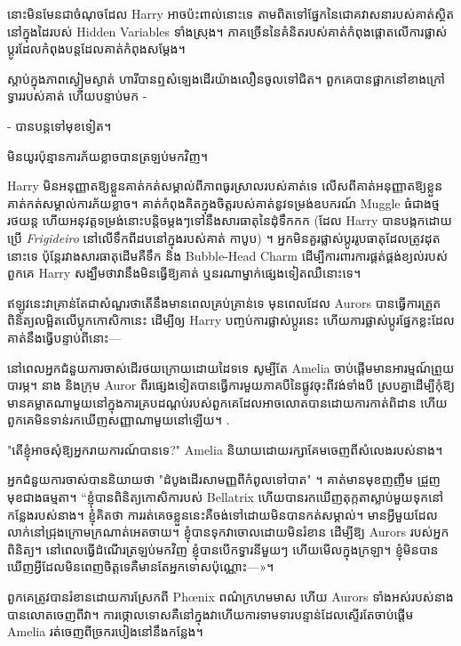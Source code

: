 {{{នោះមិនមែនជាចំណុចដែល Harry អាចប៉ះពាល់នោះទេ តាមពិតទៅផ្នែកនៃជោគវាសនារបស់គាត់ស្ថិតនៅក្នុងដៃរបស់ Hidden Variables ទាំងស្រុង។ ភាគច្រើននៃគំនិតរបស់គាត់កំពុងផ្តោតលើការផ្លាស់ប្តូរដែលកំពុងបន្តដែលគាត់កំពុងសម្តែង។

ស្តាប់ក្នុងភាពស្ងៀមស្ងាត់ ហារីបានឮសំឡេងដើរយ៉ាងលឿនចូលទៅជិត។ ពួកគេបានផ្អាកនៅខាងក្រៅទ្វាររបស់គាត់ ហើយបន្ទាប់មក -

- បានបន្តទៅមុខទៀត។

មិនយូរប៉ុន្មានការភ័យខ្លាចបានត្រឡប់មកវិញ។

Harry មិនអនុញ្ញាតឱ្យខ្លួនគាត់កត់សម្គាល់ពីភាពធូរស្រាលរបស់គាត់ទេ លើសពីគាត់អនុញ្ញាតឱ្យខ្លួនគាត់កត់សម្គាល់ការភ័យខ្លាច។ គាត់កំពុងគិតក្នុងចិត្តរបស់គាត់នូវទម្រង់ឧបករណ៍ Muggle ធំជាងថ្មរថយន្ត ហើយអនុវត្តទម្រង់នោះបន្តិចម្តងៗទៅនឹងសារធាតុនៃដុំទឹកកក (ដែល Harry បានបង្កកដោយប្រើ \emph{Frigideiro} នៅលើទឹកពីដបនៅក្នុងរបស់គាត់ កាបូប) ។ អ្នកមិនគួរផ្លាស់ប្តូររូបធាតុដែលត្រូវដុតនោះទេ ប៉ុន្តែរវាងសារធាតុដើមគឺទឹក និង Bubble-Head Charm ដើម្បីការពារការផ្គត់ផ្គង់ខ្យល់របស់ពួកគេ Harry សង្ឃឹមថាវានឹងមិនធ្វើឱ្យគាត់ ឬនរណាម្នាក់ផ្សេងទៀតឈឺនោះទេ។

ឥឡូវនេះវាគ្រាន់តែជាសំណួរថាតើនឹងមានពេលគ្រប់គ្រាន់ទេ មុនពេលដែល Aurors បានធ្វើការត្រួតពិនិត្យលម្អិតលើប្លុកកោសិកានេះ ដើម្បីឲ្យ Harry បញ្ចប់ការផ្លាស់ប្តូរនេះ ហើយការផ្លាស់ប្តូរផ្នែកខ្លះដែលគាត់នឹងធ្វើបន្ទាប់ពីនោះ—

\later

នៅពេលអ្នកជំនួយការចាស់ដើរថយក្រោយដោយដៃទទេ សូម្បីតែ Amelia ចាប់ផ្តើមមានអារម្មណ៍ព្រួយបារម្ភ។ នាង និងក្រុម Auror ពីរផ្សេងទៀតបានធ្វើការមួយភាគបីនៃផ្លូវចុះពីវង់ទាំងបី ស្របគ្នាដើម្បីកុំឱ្យមានគម្លាតណាមួយនៅក្នុងការគ្របដណ្តប់របស់ពួកគេដែលអាចលោតបានដោយការកាត់ពិដាន ហើយពួកគេមិនទាន់រកឃើញសញ្ញាណាមួយនៅឡើយ។ .

"តើខ្ញុំអាចសុំឱ្យអ្នករាយការណ៍បានទេ?" Amelia និយាយដោយរក្សាគែមចេញពីសំលេងរបស់នាង។

អ្នកជំនួយការចាស់បាននិយាយថា "ដំបូងដើរសាមញ្ញពីកំពូលទៅបាត" ។ គាត់​មាន​មុខ​ញញឺម ជ្រួញ​មុខ​ជាង​ធម្មតា។ “ខ្ញុំបានពិនិត្យកោសិការបស់ Bellatrix ហើយបានរកឃើញតុក្កតាស្លាប់មួយទុកនៅកន្លែងរបស់នាង។ ខ្ញុំគិតថា ការរត់គេចខ្លួននេះគឺចង់ទៅដោយមិនបានកត់សម្គាល់។ មានអ្វីមួយដែលលាក់នៅជ្រុងក្រោមក្រណាត់អេតចាយ។ ខ្ញុំបានទុកវាចោលដោយមិនរំខាន ដើម្បីឱ្យ Aurors របស់អ្នកពិនិត្យ។ នៅ​ពេល​ធ្វើ​ដំណើរ​ត្រឡប់​មក​វិញ ខ្ញុំ​បាន​បើក​ទ្វារ​នីមួយៗ ហើយ​មើល​ក្នុង​ក្រឡា។ ខ្ញុំ​មិន​បាន​ឃើញ​អ្វី​ដែល​មិន​ពេញ​ចិត្ត​ទេ​គឺ​មាន​តែ​អ្នក​ទោស​ប៉ុណ្ណោះ—»។

ពួកគេត្រូវបានរំខានដោយការស្រែកពី Phœnix ពណ៌ក្រហមមាស ហើយ Aurors ទាំងអស់របស់នាងបានលោតចេញពីវា។ ការថ្កោលទោសគឺនៅក្នុងវាហើយការទាមទារបន្ទាន់ដែលស្ទើរតែចាប់ផ្តើម Amelia រត់ចេញពីច្រករបៀងនៅនឹងកន្លែង។

}}}
